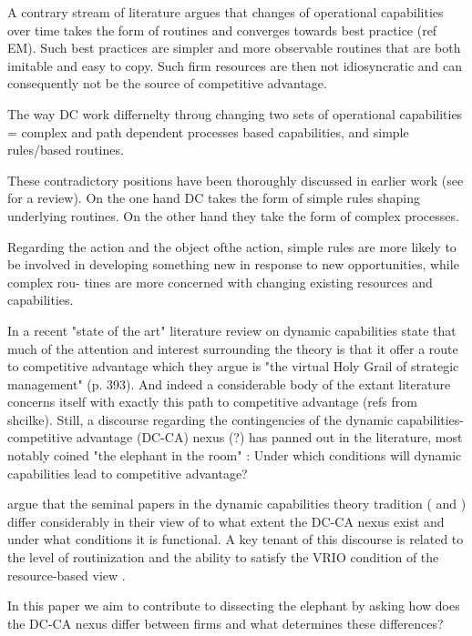 \documentclass[review,fleqn]{elsarticle}\usepackage[]{graphicx}\usepackage[]{color}
\begin{document}
A contrary stream of literature argues that changes of operational capabilities over time
takes the form of routines and converges towards best practice (ref EM). Such best
practices are simpler and more observable routines that are both imitable and easy to
copy. Such firm resources are then not idiosyncratic and can consequently not be the
source of competitive advantage. 

The way DC work differnelty throug changing two sets of operational capabilities = complex
and path dependent processes based capabilities, and simple rules/based routines. 

These contradictory positions have been thoroughly discussed in earlier work (see
\cite{Peteraf2013} for a review). On the one hand DC takes the form of simple rules
shaping underlying routines. On the other hand they take the form of complex processes.  

Regarding the action and the object ofthe action, simple rules are more likely to be
involved in developing something new in response to new opportunities, while complex
rou- tines are more concerned with changing existing resources and capabilities.

In a recent "state of the art" literature review on dynamic capabilities
\cite{Schilke2018} state that much of the attention and interest surrounding the theory is
that it offer a route to competitive advantage which they argue is "the virtual Holy Grail
of strategic management" (p. 393). And indeed a considerable body of the extant literature
concerns itself with exactly this path to competitive advantage (refs from
shcilke). Still, a discourse regarding the contingencies of the dynamic
capabilities-competitive advantage (DC-CA) nexus (?) has panned out in the literature,
most notably coined "the elephant in the room" \citep{Peteraf2013}: Under which conditions
will dynamic capabilities lead to competitive advantage?

\cite{Peteraf2013} argue that the seminal papers in the dynamic capabilities theory
tradition (\cite{Teece1997} and \cite{Eisenhardt2000}) differ considerably in their view
of to what extent the DC-CA nexus exist and under what conditions it is functional. A key
tenant of this discourse is related to the level of routinization and the ability to
satisfy the VRIO condition \citep{Barney1991a} of the resource-based view
\citep{Peteraf2013}.

In this paper we aim to contribute to dissecting the elephant by asking how does the DC-CA
nexus differ between firms and what determines these differences?
\end{document}
